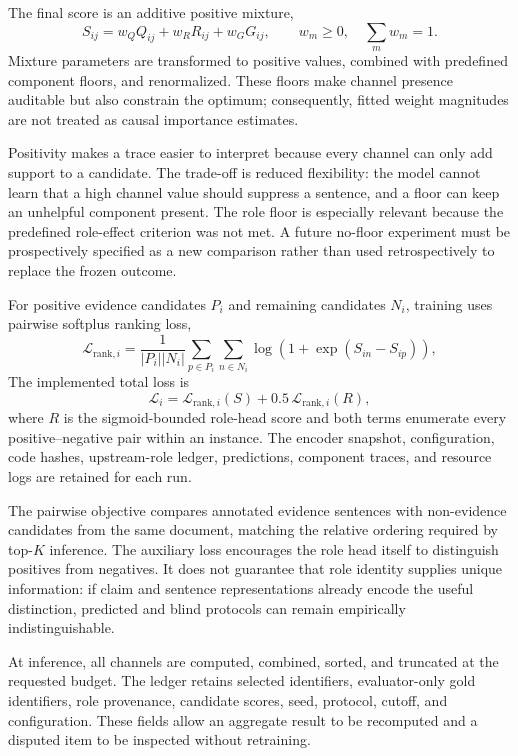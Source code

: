 \documentclass[applsci,article,submit,moreauthors]{Definitions/mdpi}
\begin{document}
The final score is an additive positive mixture,
\begin{equation}
S_{ij}=w_QQ_{ij}+w_RR_{ij}+w_GG_{ij},\qquad w_m\geq 0,\quad \sum_m w_m=1.
\end{equation}
Mixture parameters are transformed to positive values, combined with predefined component floors, and renormalized. These floors make channel presence auditable but also constrain the optimum; consequently, fitted weight magnitudes are not treated as causal importance estimates.

Positivity makes a trace easier to interpret because every channel can only add support to a candidate. The trade-off is reduced flexibility: the model cannot learn that a high channel value should suppress a sentence, and a floor can keep an unhelpful component present. The role floor is especially relevant because the predefined role-effect criterion was not met. A future no-floor experiment must be prospectively specified as a new comparison rather than used retrospectively to replace the frozen outcome.

For positive evidence candidates $P_i$ and remaining candidates $N_i$, training uses pairwise softplus ranking loss,
\begin{equation}
\mathcal{L}_{\mathrm{rank},i}=\frac{1}{|P_i||N_i|}\sum_{p\in P_i}\sum_{n\in N_i}\log\!\left(1+\exp(S_{in}-S_{ip})\right),
\end{equation}
The implemented total loss is
\begin{equation}
\mathcal{L}_{i}=\mathcal{L}_{\mathrm{rank},i}(S)+0.5\,\mathcal{L}_{\mathrm{rank},i}(R),
\end{equation}
where $R$ is the sigmoid-bounded role-head score and both terms enumerate every positive--negative pair within an instance. The encoder snapshot, configuration, code hashes, upstream-role ledger, predictions, component traces, and resource logs are retained for each run.

The pairwise objective compares annotated evidence sentences with non-evidence candidates from the same document, matching the relative ordering required by top-$K$ inference. The auxiliary loss encourages the role head itself to distinguish positives from negatives. It does not guarantee that role identity supplies unique information: if claim and sentence representations already encode the useful distinction, predicted and blind protocols can remain empirically indistinguishable.

At inference, all channels are computed, combined, sorted, and truncated at the requested budget. The ledger retains selected identifiers, evaluator-only gold identifiers, role provenance, candidate scores, seed, protocol, cutoff, and configuration. These fields allow an aggregate result to be recomputed and a disputed item to be inspected without retraining.
\end{document}
